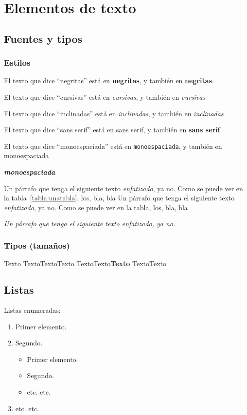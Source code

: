 \chapter{Elementos de texto}
\section{Fuentes y tipos}

\subsection*{Estilos}

 El texto que dice \enquote{negritas} está en \textbf{negritas}, y también en {\bfseries negritas}.
 
 El texto que dice \enquote{cursivas} está en \textit{cursivas}, y también en {\itshape cursivas}
 
 El texto que dice \enquote{inclinadas} está en \textsl{inclinadas}, y también en {\slshape inclinadas}

 El texto que dice \enquote{sans serif} está en \textsf{sans serif}, y también en {\sffamily \textbf{sans serif}}

 El texto que dice \enquote{monoespaciada} está en \texttt{monoespaciada}, y también en {\ttfamily monoespaciada}

 {\ttfamily \textit{\textbf{monoespaciada}}}

Un párrafo que tenga el siguiente texto \emph{enfatizado}, ya no. Como se puede ver en la tabla~\ref{tabla:unatabla}, los, bla, bla
Un párrafo que tenga el siguiente texto \emph{enfatizado}, ya no. Como se puede ver en la tabla, los, bla, bla

\textit{Un párrafo que tenga el siguiente texto \emph{enfatizado}, ya no.
}

\subsection{Tipos (tamaños)}

{\tiny Texto}
{\footnotesize Texto}{\small Texto}{\normalsize Texto}
{\large Texto}{\Large Texto}{\LARGE\bfseries\sffamily Texto}
{\huge Texto}{\Huge Texto}


\section{Listas}

Listas enumeradas:
\begin{enumerate}
  \item Primer elemento.
  \item Segundo.
  \begin{itemize}
    \item Primer elemento.
    \item Segundo.
    \item etc. etc.
  \end{itemize}  
  \item etc. etc.
\end{enumerate}


\endinput
